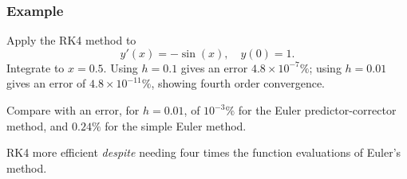 \documentclass{beamer}
\begin{document}
\begin{frame}
  \frametitle{Example}


  Apply the RK4 method to
  \begin{equation*}
    y'(x) = - \sin(x), \quad y(0) = 1.
  \end{equation*}
  Integrate to $x = 0.5$. Using $h = 0.1$ gives an error $4.8 \times
  10^{-7}\%$; using $h = 0.01$ gives an error of $4.8 \times
  10^{-11}\%$, showing fourth order convergence. \pause

  \vspace{1ex}

  Compare with an error, for $h=0.01$, of $10^{-3}\%$ for the Euler
  predictor-corrector method, and $0.24\%$ for the simple Euler
  method.

  \vspace{1ex}

  RK4 more efficient \emph{despite} needing four times the function
  evaluations of Euler's method.

\end{frame}
\end{document}
